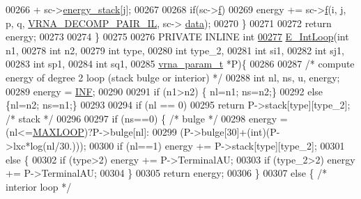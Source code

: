 \begin{DoxyCode}
00266                   + sc->\hyperlink{group__soft__constraints_ac20dded6068e81acd0f1139092f66a22}{energy\_stack}[j];
00267 
00268     \textcolor{keywordflow}{if}(sc->\hyperlink{group__soft__constraints_a32dc86090237888c75491bbd4861a04b}{f})
00269       energy += sc->\hyperlink{group__soft__constraints_a32dc86090237888c75491bbd4861a04b}{f}(i, j, p, q, \hyperlink{group__constraints_gaeab04f34d7730cff2d651d782f95d857}{VRNA\_DECOMP\_PAIR\_IL}, sc->
      \hyperlink{group__soft__constraints_a7574680143df97b9029146c2150bf06d}{data});
00270   \}
00271 
00272   \textcolor{keywordflow}{return} energy;
00273 
00274 \}
00275 
00276 PRIVATE INLINE \textcolor{keywordtype}{int}
\hypertarget{interior__loops_8h_source.tex_l00277}{}\hyperlink{group__loops_ga0266d2c7a6098259280fb97e9f980b34}{00277} \hyperlink{group__loops_ga0266d2c7a6098259280fb97e9f980b34}{E\_IntLoop}(\textcolor{keywordtype}{int} n1,
00278           \textcolor{keywordtype}{int} n2,
00279           \textcolor{keywordtype}{int} type,
00280           \textcolor{keywordtype}{int} type\_2,
00281           \textcolor{keywordtype}{int} si1,
00282           \textcolor{keywordtype}{int} sj1,
00283           \textcolor{keywordtype}{int} sp1,
00284           \textcolor{keywordtype}{int} sq1,
00285           \hyperlink{group__energy__parameters_structvrna__param__s}{vrna\_param\_t} *P)\{
00286 
00287   \textcolor{comment}{/* compute energy of degree 2 loop (stack bulge or interior) */}
00288   \textcolor{keywordtype}{int} nl, ns, u, energy;
00289   energy = \hyperlink{energy__const_8h_a12c2040f25d8e3a7b9e1c2024c618cb6}{INF};
00290 
00291   \textcolor{keywordflow}{if} (n1>n2) \{ nl=n1; ns=n2;\}
00292   \textcolor{keywordflow}{else} \{nl=n2; ns=n1;\}
00293 
00294   \textcolor{keywordflow}{if} (nl == 0)
00295     \textcolor{keywordflow}{return} P->stack[type][type\_2];  \textcolor{comment}{/* stack */}
00296 
00297   \textcolor{keywordflow}{if} (ns==0) \{                      \textcolor{comment}{/* bulge */}
00298     energy = (nl<=\hyperlink{energy__const_8h_ad1bd6eabac419670ddd3c9ed82145988}{MAXLOOP})?P->bulge[nl]:
00299       (P->bulge[30]+(\textcolor{keywordtype}{int})(P->lxc*log(nl/30.)));
00300     \textcolor{keywordflow}{if} (nl==1) energy += P->stack[type][type\_2];
00301     \textcolor{keywordflow}{else} \{
00302       \textcolor{keywordflow}{if} (type>2) energy += P->TerminalAU;
00303       \textcolor{keywordflow}{if} (type\_2>2) energy += P->TerminalAU;
00304     \}
00305     \textcolor{keywordflow}{return} energy;
00306   \}
00307   \textcolor{keywordflow}{else} \{                            \textcolor{comment}{/* interior loop */}

\end{DoxyCode}
